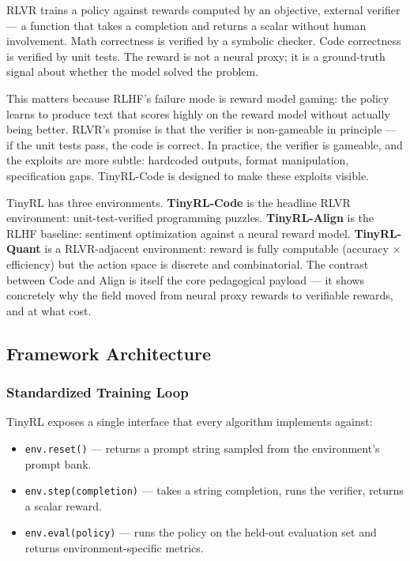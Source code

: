 RLVR trains a policy against rewards computed by an objective, external verifier --- a function that takes a completion and returns a scalar without human involvement. Math correctness is verified by a symbolic checker. Code correctness is verified by unit tests. The reward is not a neural proxy; it is a ground-truth signal about whether the model solved the problem.

This matters because RLHF's failure mode is reward model gaming: the policy learns to produce text that scores highly on the reward model without actually being better. RLVR's promise is that the verifier is non-gameable in principle --- if the unit tests pass, the code is correct. In practice, the verifier is gameable, and the exploits are more subtle: hardcoded outputs, format manipulation, specification gaps. TinyRL-Code is designed to make these exploits visible.

TinyRL has three environments. \textbf{TinyRL-Code} is the headline RLVR environment: unit-test-verified programming puzzles. \textbf{TinyRL-Align} is the RLHF baseline: sentiment optimization against a neural reward model. \textbf{TinyRL-Quant} is a RLVR-adjacent environment: reward is fully computable (accuracy $\times$ efficiency) but the action space is discrete and combinatorial. The contrast between Code and Align is itself the core pedagogical payload --- it shows concretely why the field moved from neural proxy rewards to verifiable rewards, and at what cost.

\subsection{Framework Architecture}

\subsubsection{Standardized Training Loop}

TinyRL exposes a single interface that every algorithm implements against:

\begin{itemize}
  \item \texttt{env.reset()} --- returns a prompt string sampled from the environment's prompt bank.
  \item \texttt{env.step(completion)} --- takes a string completion, runs the verifier, returns a scalar reward.
  \item \texttt{env.eval(policy)} --- runs the policy on the held-out evaluation set and returns environment-specific metrics.
\end{itemize}

